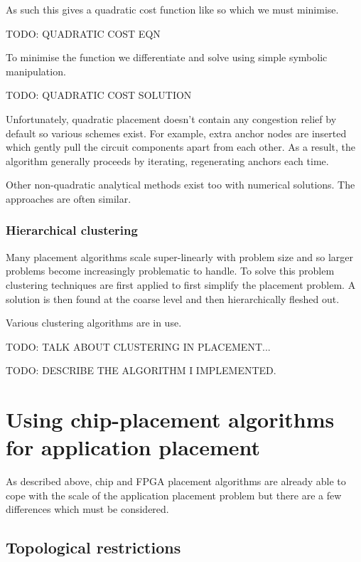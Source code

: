 				As such this gives a quadratic cost function like so which we must
				minimise.
				
				TODO: QUADRATIC COST EQN
				
				To minimise the function we differentiate and solve using simple
				symbolic manipulation.
				
				TODO: QUADRATIC COST SOLUTION
				
				Unfortunately, quadratic placement doesn't contain any congestion
				relief by default so various schemes exist. For example, extra anchor
				nodes are inserted which gently pull the circuit components apart from
				each other. As a result, the algorithm generally proceeds by iterating,
				regenerating anchors each time.
				
				Other non-quadratic analytical methods exist too with numerical
				solutions. The approaches are often similar.
			
			\subsubsection{Hierarchical clustering}
				
				Many placement algorithms scale super-linearly with problem size and so
				larger problems become increasingly problematic to handle. To solve
				this problem clustering techniques are first applied to first simplify
				the placement problem. A solution is then found at the coarse level and
				then hierarchically fleshed out.
				
				Various clustering algorithms are in use.
				
				TODO: TALK ABOUT CLUSTERING IN PLACEMENT...
				
				TODO: DESCRIBE THE ALGORITHM I IMPLEMENTED.
	
	\section{Using chip-placement algorithms for application placement}
		
		As described above, chip and FPGA placement algorithms are already able to
		cope with the scale of the application placement problem but there are a
		few differences which must be considered.
		
		\subsection{Topological restrictions}
			
